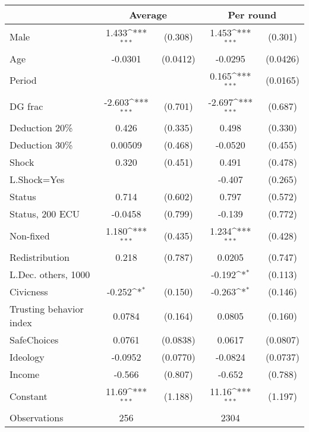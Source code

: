 {
\def\sym#1{\ifmmode^{#1}\else\(^{#1}\)\fi}
\begin{tabular}{l*{2}{cc}}
\hline\hline
                &\multicolumn{2}{c}{Average} &\multicolumn{2}{c}{Per round}\\
\hline
Male            &    1.433\sym{***}&  (0.308)&    1.453\sym{***}&  (0.301)\\
Age             &  -0.0301         & (0.0412)&  -0.0295         & (0.0426)\\
Period          &                  &         &    0.165\sym{***}& (0.0165)\\
DG frac         &   -2.603\sym{***}&  (0.701)&   -2.697\sym{***}&  (0.687)\\
Deduction 20\%  &    0.426         &  (0.335)&    0.498         &  (0.330)\\
Deduction 30\%  &  0.00509         &  (0.468)&  -0.0520         &  (0.455)\\
Shock           &    0.320         &  (0.451)&    0.491         &  (0.478)\\
L.Shock=Yes     &                  &         &   -0.407         &  (0.265)\\
Status          &    0.714         &  (0.602)&    0.797         &  (0.572)\\
Status, 200 ECU &  -0.0458         &  (0.799)&   -0.139         &  (0.772)\\
Non-fixed       &    1.180\sym{***}&  (0.435)&    1.234\sym{***}&  (0.428)\\
Redistribution  &    0.218         &  (0.787)&   0.0205         &  (0.747)\\
L.Dec. others, 1000&                  &         &   -0.192\sym{*}  &  (0.113)\\
Civicness       &   -0.252\sym{*}  &  (0.150)&   -0.263\sym{*}  &  (0.146)\\
Trusting behavior index&   0.0784         &  (0.164)&   0.0805         &  (0.160)\\
SafeChoices     &   0.0761         & (0.0838)&   0.0617         & (0.0807)\\
Ideology        &  -0.0952         & (0.0770)&  -0.0824         & (0.0737)\\
Income          &   -0.566         &  (0.807)&   -0.652         &  (0.788)\\
Constant        &    11.69\sym{***}&  (1.188)&    11.16\sym{***}&  (1.197)\\
\hline
Observations    &      256         &         &     2304         &         \\

\end{tabular}}
